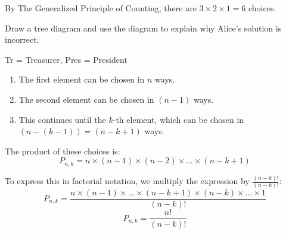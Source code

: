 \documentclass[12pt]{article}
\begin{document}
\begin{enumerate}
{\begin{tcolorbox}
By The Generalized Principle of Counting, there are $3 \times 2 \times 1 = 6$ choices.

\end{tcolorbox}

Draw a tree diagram and use the diagram to explain why Alice's solution is incorrect.}
Tr = Treasurer, Pres = President
\begin{center}
\end{center}

\newpage


\begin{enumerate}
    \item The first element can be chosen in $n$ ways.
    \item The second element can be chosen in $(n-1)$ ways.
    \item This continues until the $k$-th element, which can be chosen in $(n - (k - 1)) = (n - k + 1)$ ways.
\end{enumerate}

The product of these choices is:
\[ P_{n,k} = n \times (n-1) \times (n-2) \times \dots \times (n-k+1) \]

To express this in factorial notation, we multiply the expression by $\frac{(n-k)!}{(n-k)!}$:
\[ P_{n,k} = \frac{n \times (n-1) \times \dots \times (n-k+1) \times (n-k) \times \dots \times 1}{(n-k)!} \]
\[ P_{n,k} = \frac{n!}{(n-k)!} \]

\end{enumerate}





\end{document}
